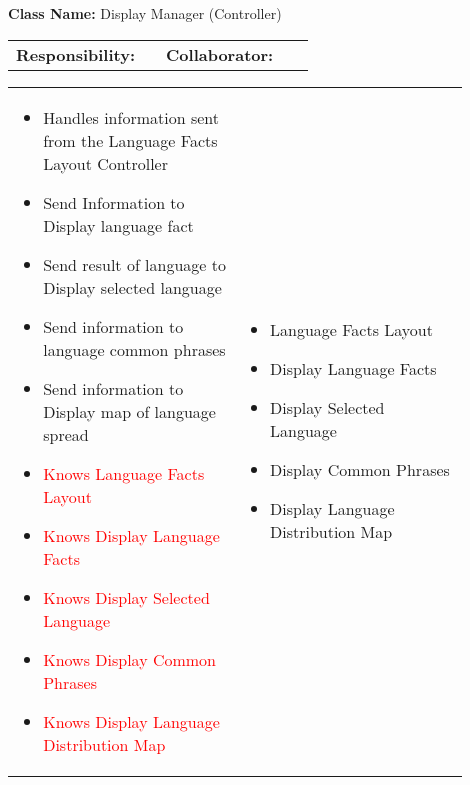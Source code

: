 \begin{cards}[]
    \textbf{Class Name:} Display Manager (Controller)
    \tcbline
    \begin{tabular}{p{0.45\linewidth} | p{0.45\linewidth}}
        \textbf{Responsibility:}& 
        \textbf{Collaborator:}\\
    \end{tabular}
    \tcbline
    \begin{tabular}{p{0.45\linewidth} | p{0.45\linewidth}}
        \begin{itemize}
            \item Handles information sent from the Language Facts Layout Controller
            \item Send Information to Display language fact
            \item Send result of language to Display selected language
            \item Send information to language common phrases
            \item Send information to Display map of language spread
            \item \textcolor{red}{Knows Language Facts Layout}
            \item \textcolor{red}{Knows Display Language Facts}
            \item \textcolor{red}{Knows Display Selected Language}
            \item \textcolor{red}{Knows Display Common Phrases}
            \item \textcolor{red}{Knows Display Language Distribution Map}
        \end{itemize}
        &
        \begin{itemize}
            \item Language Facts Layout
            \item Display Language Facts
            \item Display Selected Language
            \item Display Common Phrases
            \item Display Language Distribution Map

        \end{itemize}
    \end{tabular}
\end{cards}